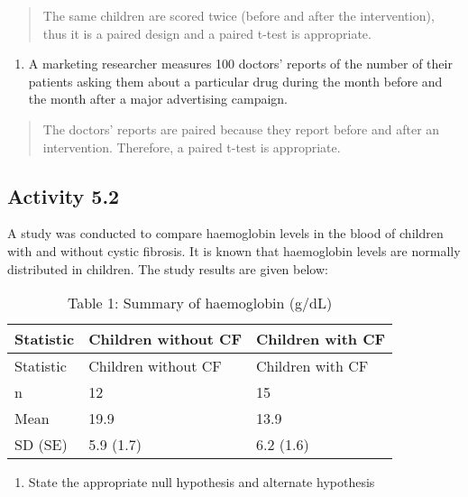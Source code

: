 \documentclass[
]{memoir}
\providecommand{\tightlist}{%
  \setlength{\itemsep}{0pt}\setlength{\parskip}{0pt}}
\begin{document}
\begin{quote}
The same children are scored twice (before and after the intervention), thus it is a paired design and a paired t-test is appropriate.
\end{quote}

\begin{enumerate}
\def\labelenumi{\alph{enumi})}
\setcounter{enumi}{3}
\tightlist
\item
  A marketing researcher measures 100 doctors' reports of the number of their patients asking them about a particular drug during the month before and the month after a major advertising campaign.
\end{enumerate}

\begin{quote}
The doctors' reports are paired because they report before and after an intervention. Therefore, a paired t-test is appropriate.
\end{quote}

\hypertarget{activity-5.2}{%
\subsection*{Activity 5.2}\label{activity-5.2}}

A study was conducted to compare haemoglobin levels in the blood of children with and without cystic fibrosis. It is known that haemoglobin levels are normally distributed in children. The study results are given below:

\begin{longtable}[]{@{}lll@{}}
\caption{Table 1: Summary of haemoglobin (g/dL)}\tabularnewline
\toprule()
Statistic & Children without CF & Children with CF \\
\midrule()
\endfirsthead
\toprule()
Statistic & Children without CF & Children with CF \\
\midrule()
\endhead
n & 12 & 15 \\
Mean & 19.9 & 13.9 \\
SD (SE) & 5.9 (1.7) & 6.2 (1.6) \\
\bottomrule()
\end{longtable}

\begin{enumerate}
\def\labelenumi{\alph{enumi})}
\tightlist
\item
  State the appropriate null hypothesis and alternate hypothesis
\end{enumerate}
\end{document}

